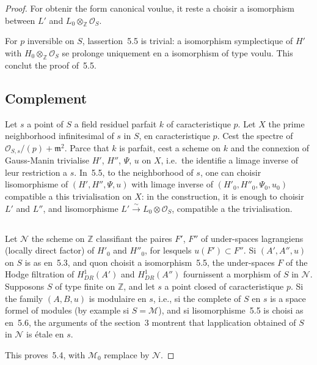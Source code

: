 \documentclass[11pt,a4paper]{article}
\theoremstyle{plain}
\theoremstyle{definition}
\begin{document}
\begin{proof}
For obtenir the form canonical voulue, it reste a choisir a isomorphism
between $L'$ and $L_0 \otimes_\mathbb{Z} \mathscr{O}_S$.

For $p$ inversible on $S$, lassertion~5.5 is trivial: a isomorphism symplectique
of $H'$ with $H_0 \otimes_\mathbb{Z} \mathscr{O}_S$ se prolonge uniquement en a isomorphism of type
voulu. This conclut the proof of~5.5.

\subsection{Complement}

Let $s$ a point of $S$ a field residuel parfait $k$ of caracteristique $p$. Let $X$ the
prime neighborhood infinitesimal of $s$ in $S$, en caracteristique $p$. Cest the spectre
of $\mathscr{O}_{S,s}/(p) + \mathfrak{m}^2$. Parce that $k$ is parfait, cest a scheme on $k$ and the connexion
of Gauss-Manin trivialise $H'$, $H''$, $\Psi$, $u$ on $X$, i.e.~the identifie a limage inverse
of leur restriction a $s$. In~5.5, to the neighborhood of $s$, one can choisir
lisomorphisme of $(H', H'', \Psi, u)$ with limage inverse of $(H'_0, H''_0, \Psi_0, u_0)$
compatible a this trivialisation on $X$: in the construction, it is enough to choisir $L'$
and $L''$, and lisomorphisme $L' \xrightarrow{\sim} L_0 \otimes \mathscr{O}_S$, compatible a the trivialisation.

\subsection{}

Let $\mathscr{N}$ the scheme on $\mathbb{Z}$ classifiant the paires $F'$, $F''$ of under-spaces
lagrangiens (locally direct factor) of $H'_0$ and $H''_0$, for lesquels $u(F') \subset F''$.
Si $(A', A'', u)$ on $S$ is as en~5.3, and quon choisit a isomorphism~5.5,
the under-spaces $F$ of the Hodge filtration of $H^1_{DR}(A')$ and $H^1_{DR}(A'')$ fournissent
a morphism of $S$ in $\mathscr{N}$. Supposons $S$ of type finite on $\mathbb{Z}$, and let $s$ a point
closed of caracteristique $p$. Si the family $(A, B, u)$ is modulaire en $s$, i.e., si the
complete of $S$ en $s$ is a space formel of modules (by example si $S = \mathscr{M}$),
and si lisomorphisme~5.5 is choisi as en~5.6, the arguments of the section~3
montrent that lapplication obtained of $S$ in $\mathscr{N}$ is étale en $s$.

This proves~5.4, with $\mathscr{M}_0$ remplace by $\mathscr{N}$.
\end{proof}
\end{document}
